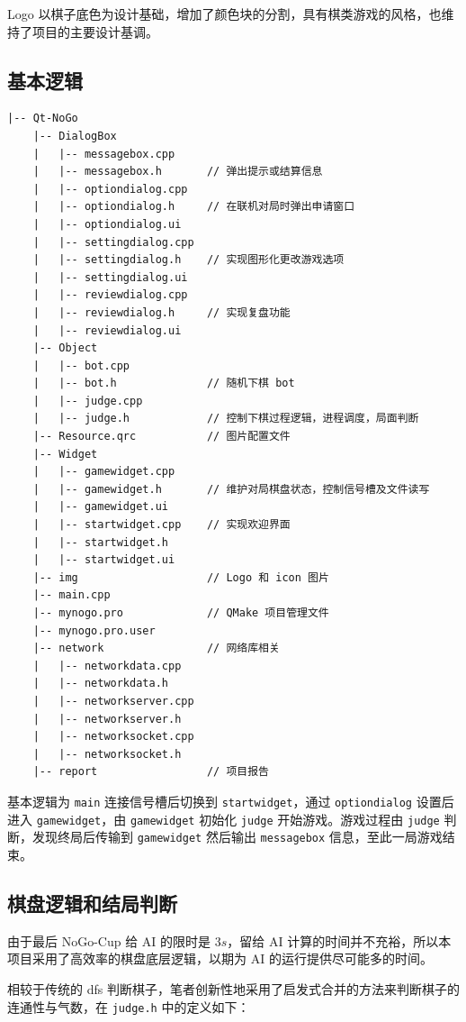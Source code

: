 \documentclass{noithesis}
\begin{document}
	Logo 以棋子底色为设计基础，增加了颜色块的分割，具有棋类游戏的风格，也维持了项目的主要设计基调。

	\subsection{基本逻辑}
	
    \begin{verbatim}
|-- Qt-NoGo
    |-- DialogBox
    |   |-- messagebox.cpp
    |   |-- messagebox.h       // 弹出提示或结算信息
    |   |-- optiondialog.cpp
    |   |-- optiondialog.h     // 在联机对局时弹出申请窗口
    |   |-- optiondialog.ui
    |   |-- settingdialog.cpp
    |   |-- settingdialog.h    // 实现图形化更改游戏选项
    |   |-- settingdialog.ui
    |   |-- reviewdialog.cpp
    |   |-- reviewdialog.h	   // 实现复盘功能
    |   |-- reviewdialog.ui
    |-- Object
    |   |-- bot.cpp
    |   |-- bot.h              // 随机下棋 bot
    |   |-- judge.cpp
    |   |-- judge.h            // 控制下棋过程逻辑，进程调度，局面判断
    |-- Resource.qrc           // 图片配置文件
    |-- Widget
    |   |-- gamewidget.cpp
    |   |-- gamewidget.h       // 维护对局棋盘状态，控制信号槽及文件读写
    |   |-- gamewidget.ui
    |   |-- startwidget.cpp    // 实现欢迎界面
    |   |-- startwidget.h
    |   |-- startwidget.ui
    |-- img                    // Logo 和 icon 图片
    |-- main.cpp
    |-- mynogo.pro             // QMake 项目管理文件
    |-- mynogo.pro.user
    |-- network                // 网络库相关
    |   |-- networkdata.cpp
    |   |-- networkdata.h
    |   |-- networkserver.cpp
    |   |-- networkserver.h
    |   |-- networksocket.cpp
    |   |-- networksocket.h
    |-- report                 // 项目报告
	\end{verbatim}

	基本逻辑为 \verb|main| 连接信号槽后切换到 \verb|startwidget|，通过 \verb|optiondialog| 设置后进入 \verb|gamewidget|，由 \verb|gamewidget| 初始化 \verb|judge| 开始游戏。游戏过程由 \verb|judge| 判断，发现终局后传输到 \verb|gamewidget| 然后输出 \verb|messagebox| 信息，至此一局游戏结束。

	\subsection{棋盘逻辑和结局判断}
	
	由于最后 NoGo-Cup 给 AI 的限时是 $3s$，留给 AI 计算的时间并不充裕，所以本项目采用了高效率的棋盘底层逻辑，以期为 AI 的运行提供尽可能多的时间。
	
	相较于传统的 dfs 判断棋子，笔者创新性地采用了启发式合并的方法来判断棋子的连通性与气数，在 \verb|judge.h| 中的定义如下：
	
\end{document}
